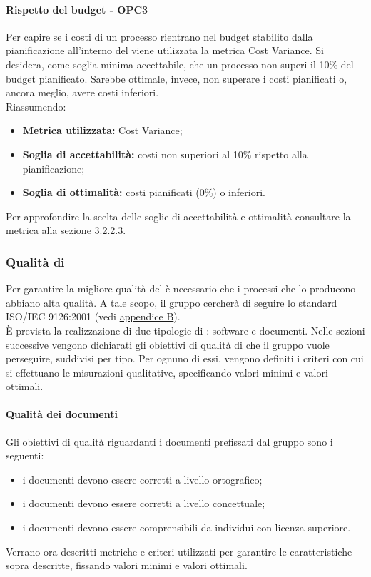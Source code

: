 \documentclass[PianoDiQualifica.tex]{subfiles}
\begin{document}
			\paragraph{Rispetto del budget - OPC3}
			Per capire se i costi di un processo rientrano nel budget stabilito dalla pianificazione all'interno del \PPdocRR{} viene utilizzata la metrica Cost Variance.
			Si desidera, come soglia minima accettabile, che un processo non superi il 10\% del budget pianificato. Sarebbe ottimale, invece, non superare i costi pianificati o, ancora meglio, avere costi inferiori.\\
			Riassumendo:
			\begin{itemize}
			\item \textbf{Metrica utilizzata:} Cost Variance;
			\item \textbf{Soglia di accettabilità:} costi non superiori al 10\% rispetto alla pianificazione;
			\item \textbf{Soglia di ottimalità:}  costi pianificati (0\%) o inferiori.
			\end{itemize}
			Per approfondire la scelta delle soglie di accettabilità e ottimalità consultare la metrica alla sezione \hyperlink{Cost_m}{3.2.2.3}.

		\subsubsection{Qualità di }
		Per garantire la migliore qualità del  è necessario che i processi che lo producono abbiano alta qualità.
		A tale scopo, il gruppo \GRUPPO{} cercherà di seguire lo standard ISO/IEC 9126:2001 (vedi \hyperlink{ISOIEC}{appendice B}). \\
		È prevista la realizzazione di due tipologie di : software e documenti.
		Nelle sezioni successive vengono dichiarati gli obiettivi di qualità di  che il gruppo vuole perseguire, suddivisi per tipo.
		Per ognuno di essi, vengono definiti i criteri con cui si effettuano le misurazioni qualitative, specificando valori minimi e valori ottimali.

			\paragraph{Qualità dei documenti}
			Gli obiettivi di qualità riguardanti i documenti prefissati dal gruppo \GRUPPO{} sono i seguenti:
			\begin{itemize}
				\item i documenti devono essere corretti a livello ortografico;
				\item i documenti devono essere corretti a livello concettuale;
				\item i documenti devono essere comprensibili da individui con licenza superiore.
			\end{itemize}
			Verrano ora descritti metriche e criteri utilizzati per garantire le caratteristiche sopra descritte, fissando valori minimi e valori ottimali.
\end{document}
